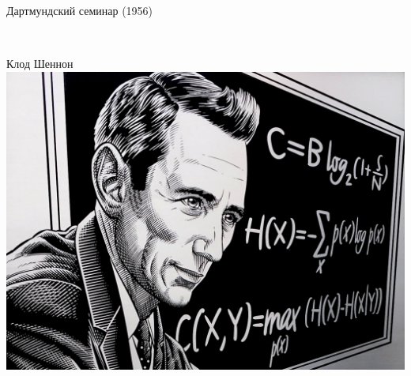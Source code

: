 \documentclass[notes,12pt, aspectratio=169]{beamer}
\begin{document}
\begin{frame}{Дартмундский семинар (1956)}
\begin{columns}[T]
\begin{column}{.48\textwidth}
		\mbox{} \\
		 \color{blue} Клод Шеннон \\
		\includegraphics[scale=0.1]{shennon.jpeg}\\
	\end{column}%
\end{columns}
\end{frame}

{
\begin{frame}
\end{frame}
}
\end{document}
